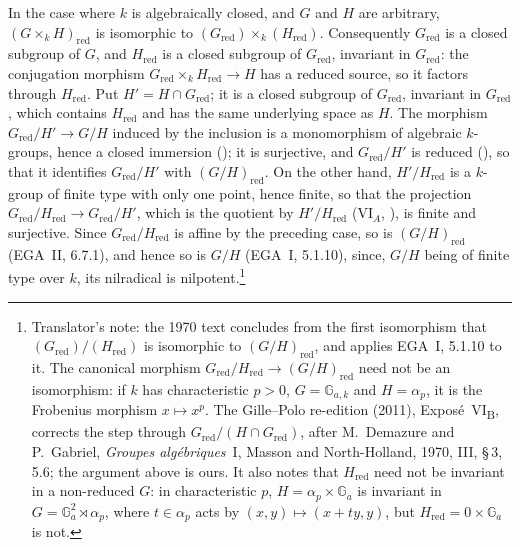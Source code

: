 In the case where \(k\) is algebraically closed, and \(G\) and \(H\) are
arbitrary, \((G\times_kH)_{\mathrm{red}}\) is isomorphic to
\((G_{\mathrm{red}})\times_k(H_{\mathrm{red}})\). Consequently \(G_{\mathrm{red}}\) is a
closed subgroup of \(G\), and \(H_{\mathrm{red}}\) is a closed subgroup of
\(G_{\mathrm{red}}\), invariant in \(G_{\mathrm{red}}\): the conjugation morphism
\(G_{\mathrm{red}}\times_kH_{\mathrm{red}}\to H\) has a reduced source, so it factors
through \(H_{\mathrm{red}}\). Put \(H'=H\cap G_{\mathrm{red}}\); it is a closed subgroup
of \(G_{\mathrm{red}}\), invariant in \(G_{\mathrm{red}}\), which contains
\(H_{\mathrm{red}}\) and has the same underlying space as \(H\). The morphism
\(G_{\mathrm{red}}/H'\to G/H\) induced by the inclusion is a monomorphism of algebraic
\(k\)-groups, hence a closed immersion
\textup{()}; it is surjective, and
\(G_{\mathrm{red}}/H'\) is reduced
\textup{()}, so that it identifies
\(G_{\mathrm{red}}/H'\) with \((G/H)_{\mathrm{red}}\). On the other hand,
\(H'/H_{\mathrm{red}}\) is a \(k\)-group of finite type with only one point, hence
finite, so that the projection
\(G_{\mathrm{red}}/H_{\mathrm{red}}\to G_{\mathrm{red}}/H'\), which is the quotient by
\(H'/H_{\mathrm{red}}\) \textup{(VI\(_A\), )},
is finite and surjective. Since \(G_{\mathrm{red}}/H_{\mathrm{red}}\) is affine by the
preceding case, so is \((G/H)_{\mathrm{red}}\) \textup{(EGA~II, 6.7.1)}, and hence so is
\(G/H\) \textup{(EGA~I, 5.1.10)}, since, \(G/H\) being of finite type over \(k\), its
nilradical is nilpotent.\footnote{Translator's note: the 1970 text concludes from the
first isomorphism that \((G_{\mathrm{red}})/(H_{\mathrm{red}})\) is isomorphic to
\((G/H)_{\mathrm{red}}\), and applies EGA~I, 5.1.10 to it. The canonical morphism
\(G_{\mathrm{red}}/H_{\mathrm{red}}\to(G/H)_{\mathrm{red}}\) need not be an isomorphism: if
\(k\) has characteristic \(p>0\), \(G=\mathbb G_{a,k}\) and \(H=\alpha_p\), it is the
Frobenius morphism \(x\mapsto x^p\). The Gille--Polo re-edition (2011),
Expos\'e~VI\textsubscript{B}, corrects the step through \(G_{\mathrm{red}}/(H\cap
G_{\mathrm{red}})\), after M.~Demazure and P.~Gabriel, \emph{Groupes alg\'ebriques}~I,
Masson and North-Holland, 1970, III, \S\,3, 5.6; the argument above is ours. It also notes
that \(H_{\mathrm{red}}\) need not be invariant in a non-reduced \(G\): in characteristic
\(p\), \(H=\alpha_p\times\mathbb G_a\) is invariant in \(G=\mathbb G_a^2\rtimes\alpha_p\),
where \(t\in\alpha_p\) acts by \((x,y)\mapsto(x+ty,y)\), but \(H_{\mathrm{red}}=0\times\mathbb
G_a\) is not.}

